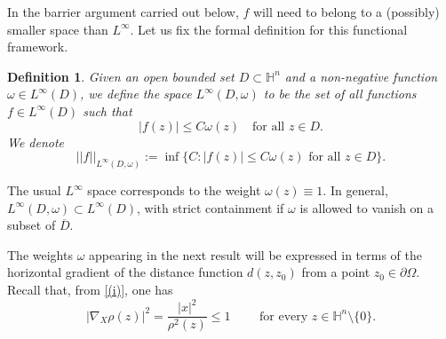 \documentclass[12pt]{amsart}
\newtheorem{Definition}[Theorem]{Definition}
\def \Hn {{\mathbb H}^n}
\def \O {\Omega}
\begin{document}
In the barrier argument carried out below, $f$ will need to belong to a (possibly) smaller space than $L^\infty$. Let us fix the formal definition for this functional framework.

\begin{Definition}\label{weightDef}
Given an open bounded set $D \subset \mathbb{H}^n$ and a non-negative function $\omega \in L^{\infty}(D)$, we define the space $L^{\infty}(D,\omega)$ to be the set of all functions $f\in L^{\infty}(D)$ such that 
\[|f(z)| \leq C\omega(z) \quad \text{for all } z \in D.\]
We denote
\[
||f||_{L^{\infty}(D,\omega)} := \inf\{C : |f(z)| \leq C\omega(z) \text{ for all } z \in D \}.
\]
\end{Definition}

The usual $L^{\infty}$ space corresponds to the weight $\omega(z) \equiv 1$. In general, $L^{\infty}(D,\omega) \subset L^{\infty}(D)$, with strict containment if $\omega$ is allowed to vanish on a subset of $\overline{D}$.

The weights $\omega$ appearing in the next result will be expressed in terms of the horizontal gradient of the distance function $d(z, z_0)$ from a point $z_0 \in \partial \O$. Recall that, from \eqref{(i)}, one has
$$
|\nabla_X\rho(z)|^2=\frac{|x|^2}{\rho^2(z)}\leq 1 \qquad\mbox{ for every }z\in \Hn\setminus\{0\}.
$$
\end{document}
